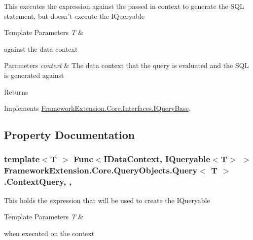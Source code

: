 This executes the expression against the passed in context to generate the S\-Q\-L statement, but doesn't execute the I\-Queryable
\begin{DoxyTemplParams}{Template Parameters}
{\em T} & \\
\hline
\end{DoxyTemplParams}
against the data context 


\begin{DoxyParams}{Parameters}
{\em context} & The data context that the query is evaluated and the S\-Q\-L is generated against\\
\hline
\end{DoxyParams}
\begin{DoxyReturn}{Returns}

\end{DoxyReturn}


Implements \hyperlink{interface_framework_extension_1_1_core_1_1_interfaces_1_1_i_query_base_accf6af70d0aea2df1721e910e9217f48}{Framework\-Extension.\-Core.\-Interfaces.\-I\-Query\-Base}.



\subsection{Property Documentation}
\hypertarget{class_framework_extension_1_1_core_1_1_query_objects_1_1_query-g_afc262d00f1a554c09fe74d2079d5e4c7}{
\subsubsection[{Context\-Query}]{\setlength{\rightskip}{0pt plus 5cm}template$<$T $>$ Func$<${\bf I\-Data\-Context}, I\-Queryable$<$T$>$ $>$ {\bf Framework\-Extension.\-Core.\-Query\-Objects.\-Query}$<$ T $>$.Context\-Query\hspace{0.3cm}{\ttfamily [get]}, {\ttfamily [set]}, {\ttfamily [protected]}}}\label{class_framework_extension_1_1_core_1_1_query_objects_1_1_query-g_afc262d00f1a554c09fe74d2079d5e4c7}


This holds the expression that will be used to create the I\-Queryable
\begin{DoxyTemplParams}{Template Parameters}
{\em T} & \\
\hline
\end{DoxyTemplParams}
when executed on the context 



